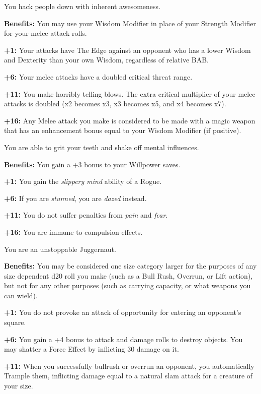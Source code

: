 
You hack people down with inherent awesomeness.

\textbf{Benefits:} You may use your Wisdom Modifier in place of your Strength Modifier for your melee attack rolls.

\textbf{+1:} Your attacks have The Edge against an opponent who has a lower Wisdom and Dexterity than your own Wisdom, regardless of relative BAB.

\textbf{+6:} Your melee attacks have a doubled critical threat range.

\textbf{+11:} You make horribly telling blows. The extra critical multiplier of your melee attacks is doubled (x2 becomes x3, x3 becomes x5, and x4 becomes x7).

\textbf{+16:} Any Melee attack you make is considered to be made with a magic weapon that has an enhancement bonus equal to your Wisdom Modifier (if positive).


You are able to grit your teeth and shake off mental influences.

\textbf{Benefits:} You gain a +3 bonus to your Willpower saves.

\textbf{+1:} You gain the \textit{slippery mind} ability of a Rogue.

\textbf{+6:} If you are \textit{stunned}, you are \textit{dazed} instead.

\textbf{+11:} You do not suffer penalties from \textit{pain} and \textit{fear}.

\textbf{+16:} You are immune to compulsion effects.


You are an unstoppable Juggernaut.

\textbf{Benefits:} You may be considered one size category larger for the purposes of any size dependent d20 roll you make (such as a Bull Rush, Overrun, or Lift action), but not for any other purposes (such as carrying capacity, or what weapons you can wield).

\textbf{+1:} You do not provoke an attack of opportunity for entering an opponent's square.

\textbf{+6:} You gain a +4 bonus to attack and damage rolls to destroy objects. You may shatter a Force Effect by inflicting 30 damage on it.

\textbf{+11:} When you successfully bullrush or overrun an opponent, you automatically Trample them, inflicting damage equal to a natural slam attack for a creature of your size.

